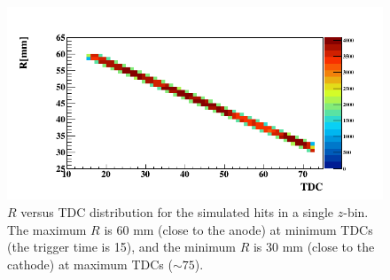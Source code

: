 \documentclass[twocolumn,showpacs,superscriptaddress,groupedaddress]{revtex4}
\begin{document}
\begin{figure}[tb]
\centering
\includegraphics[scale=0.37]{fig/TdcR_check_p1_10.png}
\caption{$R$ versus TDC distribution for the simulated hits in a single 
$z$-bin. The maximum $R$ is 60 mm (close to the anode) at minimum TDCs 
(the trigger time is 15), and the minimum $R$ is 30 mm (close to the cathode) at 
maximum TDCs ($\sim75$).}
\label{fig:R_correlation}
\end{figure} 
\end{document}

